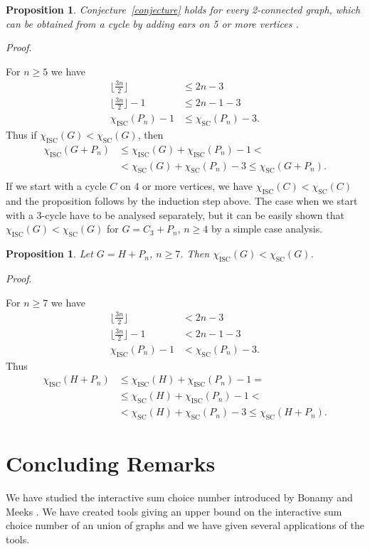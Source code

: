 \documentclass[11pt,a4paper]{article}
\theoremstyle{plain}
\newtheorem{prop}[thm]{Proposition}
\newenvironment{pf}{
  \par\medskip\noindent
  \textit{Proof}.
}{
\newline
\rightline{$\square$}  %
}
\theoremstyle{definition}
\theoremstyle{remark}
\newcommand{\scn}{\chi_\text{SC}}
\newcommand{\iscn}{\chi_\text{ISC}}
\begin{document}
\begin{prop}
Conjecture~\ref{conjecture} holds for every 2-connected graph, which can be obtained from a cycle by adding ears on 5 or more vertices .
\end{prop}
\begin{pf}
For $n\geq 5$ we have 
\begin{align*}
\lfloor{\frac{3n}{2}}\rfloor &\leq 2n-3 \\
\lfloor{\frac{3n}{2}}\rfloor -1 &\leq 2n -1 -3 \\
\iscn(P_n)-1 &\leq \scn(P_n)-3.
\end{align*}
Thus if $\iscn(G) < \scn(G)$, then
\begin{align*}
\iscn(G+P_n) &\leq \iscn(G)+\iscn(P_n)-1 < \\
			&< \scn(G)+\scn(P_n)-3 \leq \scn(G+P_n). \\
\end{align*}
If we start with a cycle $C$ on 4 or more vertices, we have $\iscn(C) < \scn(C)$ and the proposition follows by the induction step above. The case when we start with a 3-cycle have to be analysed separately, but it can be easily shown that $\iscn(G) < \scn(G)$ for $G=C_3+P_n$, $n\geq 4$ by a simple case analysis.
\end{pf}

\begin{prop}
Let $G=H+P_n$, $n\geq 7$. Then $\iscn(G) < \scn(G)$.
\end{prop}

\begin{pf}
For $n\geq 7$ we have 
\begin{align*}
\lfloor{\frac{3n}{2}}\rfloor &< 2n-3 \\
\lfloor{\frac{3n}{2}}\rfloor -1 &< 2n -1 -3 \\
\iscn(P_n)-1 &< \scn(P_n)-3.
\end{align*}
Thus
\begin{align*}
\iscn(H+P_n) &\leq \iscn(H) + \iscn(P_n) - 1 = \\
 &\leq \scn(H) + \iscn(P_n) - 1 < \\
 &< \scn(H) + \scn(P_n) - 3 \leq \scn(H+P_n).
\end{align*}
\end{pf}

\section{Concluding Remarks}

We have studied the interactive sum choice number introduced by Bonamy and Meeks \cite{iscn}. We have created tools giving an upper bound on the interactive sum choice number of an union of graphs and we have given several applications of the tools. 
\end{document}
